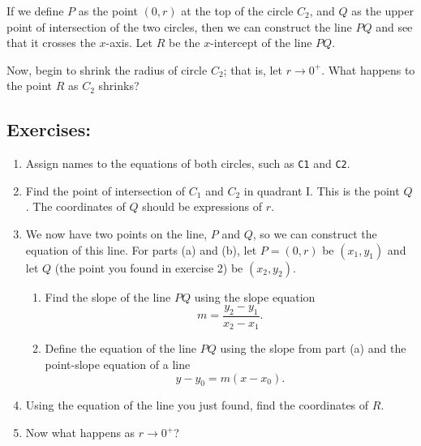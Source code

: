 If we define $P$ as the point $(0,r)$ at the top of the circle $C_2$, and $Q$ as the upper point of intersection of the two circles, then we can construct the line $PQ$ and see that it crosses the $x$-axis. Let $R$ be the $x$-intercept of the line $PQ$.

Now, begin to shrink the radius of circle $C_2$; that is, let $r\rightarrow 0^{+}$. What happens to the point $R$ as $C_2$ shrinks?

\subsection*{Exercises:}

\begin{enumerate}
	\item Assign names to the equations of both circles, such as \texttt{C1} and \texttt{C2}.
    \item Find the point of intersection of $C_1$ and $C_2$ in quadrant I. This is the point $Q$. The coordinates of $Q$ should be expressions of $r$.
	\item We now have two points on the line, $P$ and $Q$, so we can construct the equation of this line. For parts (a) and (b), let $P = (0,r)$ be $(x_1,y_1)$ and let $Q$ (the point you found in exercise 2) be $(x_2,y_2)$.
	\begin{enumerate}
	\item Find the slope of the line $PQ$ using the slope equation \[ m = \frac{y_2 - y_1}{x_2 - x_1}. \]
	\item Define the equation of the line $PQ$ using the slope from part (a) and the point-slope equation of a line	\[ y - y_0 = m (x - x_0). \]
	\end{enumerate}
	\item Using the equation of the line you just found, find the coordinates of $R$. 
	\item Now what happens as $r \to 0^+$?
\end{enumerate}


